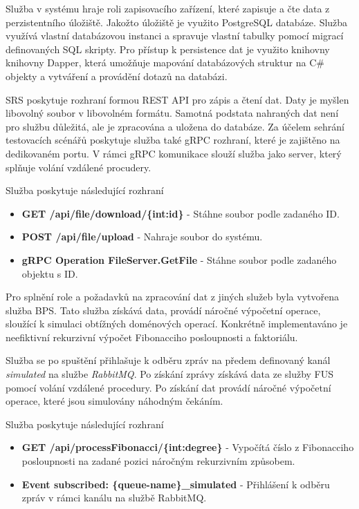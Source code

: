 
Služba v systému hraje roli zapisovacího zařízení, které zapisuje a čte data z perzistentního úložiště. Jakožto úložiště je využito PostgreSQL databáze. Služba využívá vlastní databázovou instanci a spravuje vlastní tabulky pomocí migrací definovaných SQL skripty. Pro přístup k persistence dat je využito knihovny knihovny Dapper, která umožňuje mapování databázových struktur na C\# objekty a vytváření a provádění dotazů na databázi.

SRS poskytuje rozhraní formou REST API pro zápis a čtení dat. Daty je myšlen libovolný soubor v libovolném formátu. Samotná podstata nahraných dat není pro službu důležitá, ale je zpracována a uložena do databáze. Za účelem sehrání testovacích scénářů poskytuje služba také gRPC rozhraní, které je zajištěno na dedikovaném portu. V rámci gRPC komunikace slouží služba jako server, který splňuje volání vzdálené procudery.

Služba poskytuje následující rozhraní

\begin{itemize}
    \item \textbf{GET /api/file/download/\{int:id\}} - Stáhne soubor podle zadaného ID.
    \item \textbf{POST /api/file/upload} - Nahraje soubor do systému.
    \item \textbf{gRPC Operation FileServer.GetFile} - Stáhne soubor podle zadaného objektu s ID.
\end{itemize}


Pro splnění role a požadavků na zpracování dat z jiných služeb byla vytvořena služba BPS. Tato služba získává data, provádí náročné výpočetní operace, sloužící k simulaci obtížných doménových operací. Konkrétně implementaváno je neefiktivní rekurzivní výpočet Fibonacciho posloupnosti a faktoriálu.

Služba se po spuštění přihlašuje k odběru zpráv na předem definovaný kanál \emph{simulated} na službe \emph{RabbitMQ}. Po získání zprávy získává data ze služby FUS pomocí volání vzdálené procedury. Po získání dat provádí náročné výpočetní operace, které jsou simulovány náhodným čekáním.

Služba poskytuje následující rozhraní

\begin{itemize}
    \item \textbf{GET /api/processFibonacci/\{int:degree\}} - Vypočítá číslo z Fibonacciho posloupnosti na zadané pozici náročným rekurzivním způsobem.
    \item \textbf{Event subscribed: \{queue-name\}\_simulated} - Přihlášení k odběru zpráv v rámci kanálu na službě RabbitMQ.
\end{itemize}

